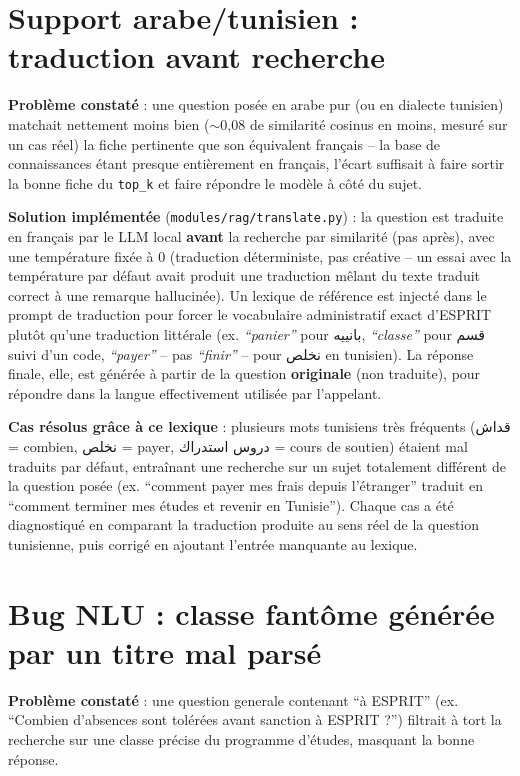 \documentclass[11pt,a4paper]{report}
\begin{document}
\section{Support arabe/tunisien : traduction avant recherche}
\textbf{Problème constaté} : une question posée en arabe pur (ou en dialecte tunisien)
matchait nettement moins bien ($\sim$0,08 de similarité cosinus en moins, mesuré sur un
cas réel) la fiche pertinente que son équivalent français -- la base de connaissances
étant presque entièrement en français, l'écart suffisait à faire sortir la bonne fiche du
\texttt{top\_k} et faire répondre le modèle à côté du sujet.

\textbf{Solution implémentée} (\texttt{modules/rag/translate.py}) : la question est
traduite en français par le LLM local \textbf{avant} la recherche par similarité (pas
après), avec une température fixée à 0 (traduction déterministe, pas créative -- un essai
avec la température par défaut avait produit une traduction mêlant du texte traduit
correct à une remarque hallucinée). Un lexique de référence est injecté dans le prompt de
traduction pour forcer le vocabulaire administratif exact d'ESPRIT plutôt qu'une
traduction littérale (ex. \emph{``panier''} pour بانييه, \emph{``classe''} pour قسم suivi
d'un code, \emph{``payer''} -- pas \emph{``finir''} -- pour نخلص en tunisien). La réponse
finale, elle, est générée à partir de la question \textbf{originale} (non traduite), pour
répondre dans la langue effectivement utilisée par l'appelant.

\begin{noteinfo}
\textbf{Cas résolus grâce à ce lexique} : plusieurs mots tunisiens très fréquents
(قداش = combien, نخلص = payer, دروس استدراك = cours de soutien) étaient mal traduits par
défaut, entraînant une recherche sur un sujet totalement différent de la question posée
(ex. ``comment payer mes frais depuis l'étranger'' traduit en ``comment terminer mes
études et revenir en Tunisie''). Chaque cas a été diagnostiqué en comparant la traduction
produite au sens réel de la question tunisienne, puis corrigé en ajoutant l'entrée
manquante au lexique.
\end{noteinfo}

\section{Bug NLU : classe fantôme générée par un titre mal parsé}
\textbf{Problème constaté} : une question generale contenant ``à ESPRIT'' (ex.
``Combien d'absences sont tolérées avant sanction à ESPRIT ?'') filtrait à tort la
recherche sur une classe précise du programme d'études, masquant la bonne réponse.
\end{document}
